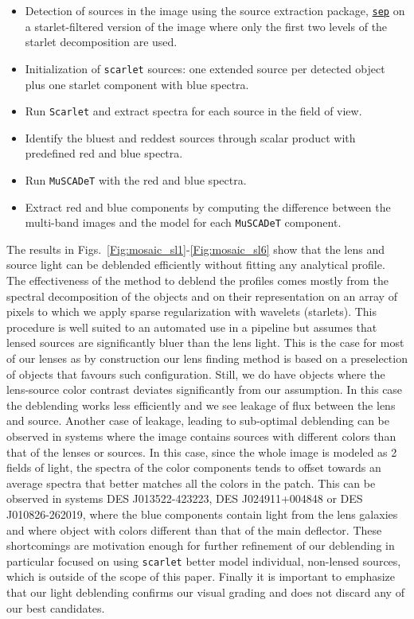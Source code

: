 \documentclass[tradiabstract,twocolumn]{aa}
\begin{document}
\begin{itemize}
    \item Detection of sources in the image using the source extraction package, \href{https://github.com/kbarbary/sep}{\faGithub \tt sep} \citep{Bertin1996} on a starlet-filtered version of the image where only the first two levels of the starlet decomposition are used.
    \item Initialization of {\tt scarlet} sources: one extended source per detected object plus one starlet component with blue spectra.
    \item Run {\tt Scarlet} and extract spectra for each source in the field of view.
    \item Identify the bluest and reddest sources through scalar product with predefined red and blue spectra.
    \item Run {\tt MuSCADeT} with the red and blue spectra.
    \item Extract red and blue components by computing the difference between the multi-band images and the model for each {\tt MuSCADeT} component.
\end{itemize}

The results in Figs.~\ref{Fig:mosaic_sl1}-\ref{Fig:mosaic_sl6} show that the lens and source light can be deblended efficiently without fitting any analytical profile. The effectiveness of the method to deblend the profiles comes mostly from the spectral decomposition of the objects and on their representation on an array of pixels to which we apply sparse regularization with wavelets (starlets). This procedure is well suited to an automated use in a pipeline but assumes that lensed sources are significantly bluer than the lens light. This is the case for most of our lenses as by construction our lens finding method is based on a preselection of objects that favours such configuration. Still, we do have objects where the lens-source color contrast deviates significantly from our assumption. In this case the deblending works less efficiently and we see leakage of flux between the lens and source. 
Another case of leakage, leading to sub-optimal deblending can be observed in systems where the image contains sources with different colors than that of the lenses or sources. In this case, since the whole image is modeled as 2 fields of light, the spectra of the color components tends to offset towards an average spectra that better matches all the colors in the patch. This can be observed in systems DES J013522-423223, DES J024911+004848 or DES J010826-262019, where the blue components contain light from the lens galaxies and where object with colors different than that of the main deflector. 
These shortcomings are motivation enough for further refinement of our deblending in particular focused on using {\tt scarlet} better model individual, non-lensed sources, which is outside of the scope of this paper. 
Finally it is important to emphasize that our light deblending confirms our visual grading and does not discard any of our best candidates.
\end{document}
